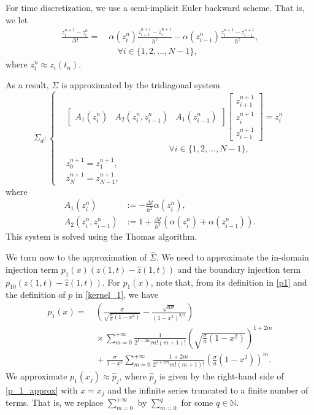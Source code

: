 \documentclass[twocolumn]{autart}
\begin{document}
For time discretization, we use a semi-implicit Euler backward scheme. That is, we let
\begin{align*}
\frac{z_i^{n+1}-z_i^n}{\Delta t} =&~ \alpha(z_i^n)\frac{z^{n+1}_{i+1}-z^{n+1}_i}{h^2}-\alpha(z^n_{i-1})\frac{z^{n+1}_i-z^{n+1}_{i-1}}{h^2}, \\
&~ \quad \forall i\in \{1,2,...,N-1\},
\end{align*}
where $z_i^n \approx z_i(t_n)$.

As a result, $\Sigma$ is approximated by the tridiagonal system
\begin{equation*}
\Sigma_d : \left\lbrace 
\begin{aligned}
&\begin{bmatrix}
A_1(z_i^n) & A_2(z_i^n,z_{i-1}^n) & A_1(z_{i-1}^n)
\end{bmatrix} \begin{bmatrix}
z_{i+1}^{n+1} \\ z_i^{n+1} \\ z_{i-1}^{n+1}
\end{bmatrix} = z_i^n \\
&\qquad \qquad \qquad \qquad \qquad \qquad \forall i\in \{1,2,...,N-1\}, \\
&z_0^{n+1} = z_1^{n+1}, \\
&z_N^{n+1} = z_{N-1}^{n+1},
\end{aligned}
\right.
\end{equation*}
where 
\begin{align*}
A_1(z_i^n) &:= -\frac{\Delta t}{h^2}\alpha (z_i^n),  \\
A_2(z_i^n,z_{i-1}^n) &:= 1 + \frac{\Delta t}{h^2}\left(\alpha (z_i^n) + \alpha (z_{i-1}^n)\right).
\end{align*}
This system is solved using the Thomas algorithm.

We turn now to the approximation of $\hat{\Sigma}$. We need to approximate the in-domain injection term $p_1(x)(z(1,t)-\hat{z}(1,t))$ and the boundary injection term $p_{10}(z(1,t)-\hat{z}(1,t))$. For $p_1(x)$, note that, from its definition in \eqref{p1} and the definition of $p$ in \eqref{kernel_1}, we have 
\begin{align}
p_1(x)
=&~ \left(\frac{\sigma}{\sqrt{\frac{\sigma}{a}\left(1-x^2\right)}}-\frac{\sqrt{a\sigma}}{(1-x^2)^{3/2}}\right) \nonumber \\
&~\times \sum_{m=0}^{+\infty} \frac{1}{2^{1+2m}m!(m+1)!}\left(\sqrt{\frac{\sigma}{a}(1-x^2)}\right)^{1+2m} \nonumber \\
&~+\frac{\sigma}{1-x^2}\sum_{m=0}^{+\infty}\frac{1+2m}{2^{1+2m}m!(m+1)!}\left(\frac{\sigma}{a}(1-x^2)\right)^{m}.\label{p_1_approx}
\end{align}
We approximate $p_1(x_j)\approx \hat{p}_j$, where $\hat{p}_j$ is given by the right-hand side of \eqref{p_1_approx} with $x=x_j$ and the infinite series truncated to a finite number of terms. That is, we replace $\sum_{m=0}^{+\infty}$ by $\sum_{m=0}^{q}$ for some $q\in \mathbb{N}$. 
\end{document}
